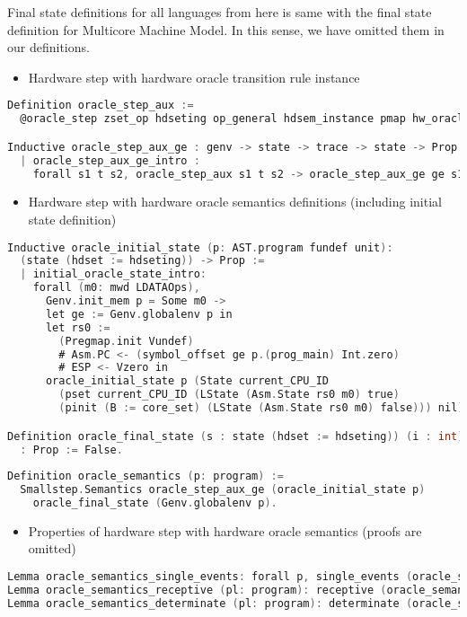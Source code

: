 Final state definitions for all languages from here is same with the final state definition for Multicore Machine Model. In this sense, 
we have omitted them in our definitions. 

\begin{itemize}[leftmargin=*]
\item Hardware step with hardware oracle transition rule instance
\end{itemize}
\begin{lstlisting}[language=C]
Definition oracle_step_aux :=
  @oracle_step zset_op hdseting op_general hdsem_instance pmap hw_oracle.

Inductive oracle_step_aux_ge : genv -> state -> trace -> state -> Prop :=
  | oracle_step_aux_ge_intro : 
    forall s1 t s2, oracle_step_aux s1 t s2 -> oracle_step_aux_ge ge s1 t s2.
\end{lstlisting}

\begin{itemize}[leftmargin=*]
\item Hardware step with hardware oracle semantics definitions (including initial state definition)
\end{itemize}
\begin{lstlisting}[language=C]
Inductive oracle_initial_state (p: AST.program fundef unit): 
  (state (hdset := hdseting)) -> Prop := 
  | initial_oracle_state_intro: 
    forall (m0: mwd LDATAOps),
      Genv.init_mem p = Some m0 ->
      let ge := Genv.globalenv p in
      let rs0 :=
        (Pregmap.init Vundef)
        # Asm.PC <- (symbol_offset ge p.(prog_main) Int.zero)
        # ESP <- Vzero in
      oracle_initial_state p (State current_CPU_ID 
        (pset current_CPU_ID (LState (Asm.State rs0 m0) true)
        (pinit (B := core_set) (LState (Asm.State rs0 m0) false))) nil).

Definition oracle_final_state (s : state (hdset := hdseting)) (i : int)
  : Prop := False.
      
Definition oracle_semantics (p: program) :=
  Smallstep.Semantics oracle_step_aux_ge (oracle_initial_state p) 
    oracle_final_state (Genv.globalenv p). 
\end{lstlisting}

\begin{itemize}[leftmargin=*]
\item Properties of hardware step with hardware oracle semantics (proofs are omitted)
\end{itemize}
\begin{lstlisting}[language=C]
Lemma oracle_semantics_single_events: forall p, single_events (oracle_semantics p).
Lemma oracle_semantics_receptive (pl: program): receptive (oracle_semantics pl).
Lemma oracle_semantics_determinate (pl: program): determinate (oracle_semantics pl).
\end{lstlisting}

